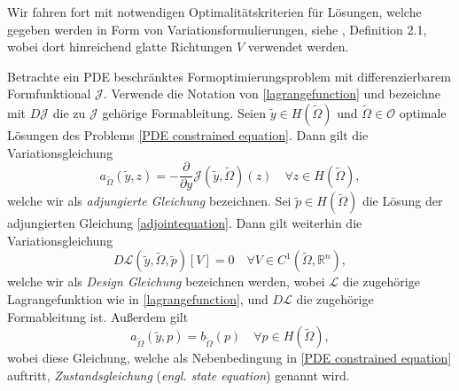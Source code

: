 Wir fahren fort mit notwendigen Optimalitätskriterien für Lösungen, welche gegeben werden in Form von Variationsformulierungen, siehe \cite{LagrangeNewton}, Definition 2.1, wobei dort hinreichend glatte Richtungen $V$ verwendet werden.

\begin{defi}
	Betrachte ein PDE beschränktes Formoptimierungsproblem mit differenzierbarem Formfunktional $\mathcal{J}$. Verwende die Notation von \ref{lagrangefunction} und bezeichne mit $D\mathcal{J}$ die zu $\mathcal{J}$ gehörige Formableitung. Seien $\tilde{y} \in H(\tilde{\Omega})$ und $\tilde{\Omega}\in \mathcal{O}$ optimale Lösungen des Problems \ref{PDE constrained equation}. Dann gilt die Variationsgleichung
\begin{equation}\label{adjointequation}
	a_{\tilde{\Omega}}(\tilde{y},z) = - \frac{\partial}{\partial y} \mathcal{J}(\tilde{y},\tilde{\Omega})(z) \quad \forall z\in H(\tilde{\Omega}),
\end{equation}
welche wir als \textit{adjungierte Gleichung} bezeichnen. Sei $\tilde{p} \in H(\tilde{\Omega})$ die Lösung der adjungierten Gleichung \ref{adjointequation}. Dann gilt weiterhin die Variationsgleichung
\begin{equation}\label{Design equation}
	D\mathcal{L}(\tilde{y}, \tilde{\Omega}, \tilde{p})[V] = 0 \quad \forall V \in C^1(\tilde{\Omega},\mathbb{R}^n),
\end{equation}
welche wir als \textit{Design Gleichung} bezeichnen werden, wobei $\mathcal{L}$ die zugehörige Lagrangefunktion wie in \ref{lagrangefunction}, und $D\mathcal{L}$ die zugehörige Formableitung ist. Außerdem gilt
\begin{equation}
	a_{\tilde{\Omega}}(\tilde{y},p) = b_{\tilde{\Omega}}(p) \quad \forall p \in H(\tilde{\Omega}),
\end{equation}
wobei diese Gleichung, welche als Nebenbedingung in \ref{PDE constrained equation} auftritt, \textit{Zustandsgleichung} (\textit{engl. state equation}) genannt wird.
\end{defi}

